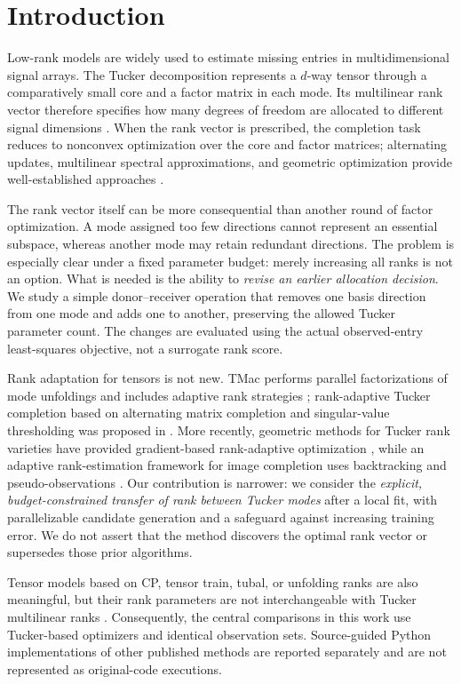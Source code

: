 \documentclass[review,10pt]{elsarticle}
\begin{document}
\section{Introduction}\label{sec:introduction}
Low-rank models are widely used to estimate missing entries in multidimensional signal arrays. The Tucker decomposition represents a $d$-way tensor through a comparatively small core and a factor matrix in each mode. Its multilinear rank vector therefore specifies how many degrees of freedom are allocated to different signal dimensions \cite{KoldaBader2009,DeLathauwer2000svd}. When the rank vector is prescribed, the completion task reduces to nonconvex optimization over the core and factor matrices; alternating updates, multilinear spectral approximations, and geometric optimization provide well-established approaches \cite{DeLathauwer2000best,KasaiMishra2016}.

The rank vector itself can be more consequential than another round of factor optimization. A mode assigned too few directions cannot represent an essential subspace, whereas another mode may retain redundant directions. The problem is especially clear under a fixed parameter budget: merely increasing all ranks is not an option. What is needed is the ability to \emph{revise an earlier allocation decision}. We study a simple donor--receiver operation that removes one basis direction from one mode and adds one to another, preserving the allowed Tucker parameter count. The changes are evaluated using the actual observed-entry least-squares objective, not a surrogate rank score.

Rank adaptation for tensors is not new. TMac performs parallel factorizations of mode unfoldings and includes adaptive rank strategies \cite{XuHaoYinSu2015}; rank-adaptive Tucker completion based on alternating matrix completion and singular-value thresholding was proposed in \cite{LiuShiLiao2023}. More recently, geometric methods for Tucker rank varieties have provided gradient-based rank-adaptive optimization \cite{GaoPengYuan2025}, while an adaptive rank-estimation framework for image completion uses backtracking and pseudo-observations \cite{MiHeLiLiu2026}. Our contribution is narrower: we consider the \emph{explicit, budget-constrained transfer of rank between Tucker modes} after a local fit, with parallelizable candidate generation and a safeguard against increasing training error. We do not assert that the method discovers the optimal rank vector or supersedes those prior algorithms.

Tensor models based on CP, tensor train, tubal, or unfolding ranks are also meaningful, but their rank parameters are not interchangeable with Tucker multilinear ranks \cite{KoldaBader2009,LiuMusialskiWonkaYe2013}. Consequently, the central comparisons in this work use Tucker-based optimizers and identical observation sets. Source-guided Python implementations of other published methods are reported separately and are not represented as original-code executions.
\end{document}
